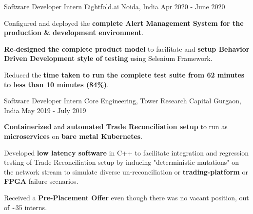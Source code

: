 \begin{cventries}

  \cventry
    {Software Developer Intern} %
    {Eightfold.ai} %
    {Noida, India} %
    {Apr 2020 - June 2020} %
    {
      \begin{cvitems} %
        \item {Configured and deployed the \textbf{complete Alert Management System for the production \& development environment}.}
        \item {\textbf{Re-designed the complete product model} to facilitate and \textbf{setup Behavior Driven Development style of testing} using Selenium Framework.}
        \item {Reduced the \textbf{time taken to run the complete test suite from 62 minutes to less than 10 minutes (84\%)}.}
      \end{cvitems}
    }


  \cventry
    {Software Developer Intern} %
    {Core Engineering, Tower Research Capital} %
    {Gurgaon, India} %
    {May 2019 - July 2019} %
    {
      \begin{cvitems} %
        \item {\textbf{Containerized} and \textbf{automated Trade Reconciliation setup} to run as \textbf{microservices} on \textbf{bare metal Kubernetes}.}
        \item {Developed \textbf{low latency software} in C++ to facilitate integration and regression testing of Trade Reconciliation setup by inducing "deterministic mutations" on the network stream to simulate diverse un-reconciliation or \textbf{trading-platform} or \textbf{FPGA} failure scenarios.}
        \item {Received a \textbf{Pre-Placement Offer} even though there was no vacant position, out of \textasciitilde 35 interns.}
      \end{cvitems}
    }


\end{cventries}

